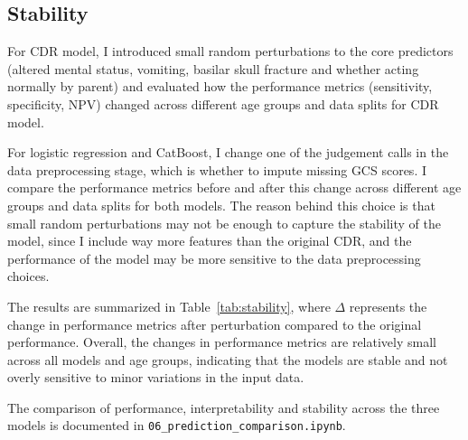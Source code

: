 \documentclass[10pt,letterpaper]{article}
\begin{document}
\subsection{Stability}

For CDR model, I introduced small random perturbations to the core predictors (altered mental status, vomiting, basilar skull fracture and whether acting normally by parent) and evaluated how the performance metrics (sensitivity, specificity, NPV) changed across different age groups and data splits for CDR model. 

For logistic regression and CatBoost, I change one of the judgement calls in the data preprocessing stage, which is whether to impute missing GCS scores. I compare the performance metrics before and after this change across different age groups and data splits for both models. The reason behind this choice is that small random perturbations may not be enough to capture the stability of the model, since I include way more features than the original CDR, and the performance of the model may be more sensitive to the data preprocessing choices.

The results are summarized in Table~\ref{tab:stability}, where $\Delta$ represents the change in performance metrics after perturbation compared to the original performance. Overall, the changes in performance metrics are relatively small across all models and age groups, indicating that the models are stable and not overly sensitive to minor variations in the input data. 

The comparison of performance, interpretability and stability across the three models is documented in \texttt{06\_prediction\_comparison.ipynb}.
\end{document}
